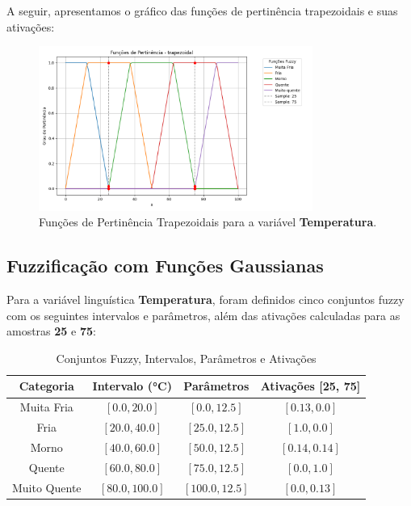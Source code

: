 \documentclass[a4paper,12pt]{article}
\begin{document}
A seguir, apresentamos o gráfico das funções de pertinência trapezoidais e suas ativações:

\begin{figure}[H]
    \centering
    \includegraphics[width=0.8\textwidth]{img/funções_de_pertinência_trapezoidal_fuzzificado.png}
    \caption{Funções de Pertinência Trapezoidais para a variável \textbf{Temperatura}.}
\end{figure}


\subsection{Fuzzificação com Funções Gaussianas}

Para a variável linguística \textbf{Temperatura}, foram definidos cinco conjuntos fuzzy com os seguintes intervalos e parâmetros, além das ativações calculadas para as amostras \textbf{25} e \textbf{75}:

\begin{table}[H]
\centering
\caption{Conjuntos Fuzzy, Intervalos, Parâmetros e Ativações}
\begin{tabular}{|c|c|c|c|}
\hline
\textbf{Categoria}    & \textbf{Intervalo (°C)} & \textbf{Parâmetros}       & \textbf{Ativações [25, 75]} \\ \hline
Muita Fria            & $[0.0, 20.0]$          & $[0.0, 12.5]$             & $[0.13, 0.0]$              \\ \hline
Fria                  & $[20.0, 40.0]$         & $[25.0, 12.5]$            & $[1.0, 0.0]$               \\ \hline
Morno                 & $[40.0, 60.0]$         & $[50.0, 12.5]$            & $[0.14, 0.14]$             \\ \hline
Quente                & $[60.0, 80.0]$         & $[75.0, 12.5]$            & $[0.0, 1.0]$               \\ \hline
Muito Quente          & $[80.0, 100.0]$        & $[100.0, 12.5]$           & $[0.0, 0.13]$              \\ \hline
\end{tabular}
\end{table}
\end{document}
